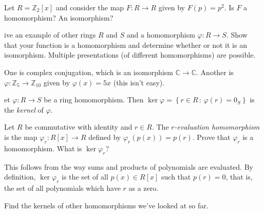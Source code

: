 \documentclass[english,course]{lecture}
\def\p{\varphi}
\newenvironment{solution}[1][Solution]{\begin{trivlist}\pushQED{\qed}\item[\hskip \labelsep  \bfseries #1{}.\hspace{10pt}]}{\popQED\end{trivlist}}\renewcommand{\qedsymbol}{$\checkmark$}{\newenvironment{answer}{\renewcommand\qedsymbol{$\blacklozenge$}\begin{proof}[Answer]}{\end{proof}}}\newenvironment{answer}[1][Answer]{\begin{trivlist}\pushQED{\qed}\item[\hskip \labelsep  \bfseries #1{}.\hspace{10pt}]}{\popQED\end{trivlist}}\renewcommand{\qedsymbol}{$\lozenge$}
\theoremstyle{plain}
\newenvironment{exercise}[1]
  {\renewcommand\theinnerexercise{#1}\innerexercise}
  {\endinnerexercise}
\newenvironment{definition}[1]
  {\renewcommand\theinnerdefinition{#1}\innerdefinition}
  {\endinnerdefinition}
\def\setof#1#2{{\left\{#1\,\colon\,#2\right\}}}
\def\C{{\mathbb C}}
\def\Z{{\mathbb Z}}
\def\presnotes{}
\begin{document}


\begin{exer}
	Let $R = \Z_2[x]$ and consider the map $F: R \to R$ given by $F(p) = p^2$.
	Is $F$ a homomorphism? An isomorphism?
\end{exer}

\begin{solution}

\end{solution}


\begin{exercise}
	Give an example of other rings $R$ and $S$ and a homomorphism $\p : R\to S$.
	Show that your function is a homomorphism and determine whether or not it is an isomorphism.
	Multiple presentations (of different homomorphisms) are possible.
\end{exercise}

\begin{solution}
	One is complex conjugation, which is an isomorphism $\C\to\C$. Another is $\p : \Z_5 \to \Z_{10}$ given by $\p(x) = 5x$ (this isn't easy).
\end{solution}



\begin{definition}
	Let $\p : R \to S$ be a ring homomorphism.
	Then $\ker \p =\setof{r\in R}{\p(r)=0_S}$ is the \emph{kernel} of $\p$.
\end{definition}

\begin{exer}
	Let $R$ be commutative with identity and $r\in R$.
	The \emph{$r$-evaluation homomorphism} is the map $\p_r : R[x] \to R$ defined by $\p_r(p(x)) = p(r)$.
	Prove that $\p_r$ is a homomorphism.
	What is $\ker \p_r$?
\end{exer}

\begin{solution}
	This follows from the way sums and products of polynomials are evaluated.
	By definition, $\ker \p_r$ is the set of all $p(x)\in R[x]$ such that $p(r) =0$, that is, the set of all polynomials which have $r$ as a zero.
\end{solution}


\begin{exer}
	Find the kernels of other homomorphisms we've looked at so far.
\end{exer}

\begin{solution}
	
\end{solution}
\end{document}
